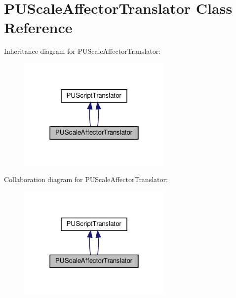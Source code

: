 \hypertarget{classPUScaleAffectorTranslator}{}\section{P\+U\+Scale\+Affector\+Translator Class Reference}
\label{classPUScaleAffectorTranslator}


Inheritance diagram for P\+U\+Scale\+Affector\+Translator\+:
\nopagebreak
\begin{figure}[H]
\begin{center}
\leavevmode
\includegraphics[width=214pt]{classPUScaleAffectorTranslator__inherit__graph}
\end{center}
\end{figure}


Collaboration diagram for P\+U\+Scale\+Affector\+Translator\+:
\nopagebreak
\begin{figure}[H]
\begin{center}
\leavevmode
\includegraphics[width=214pt]{classPUScaleAffectorTranslator__coll__graph}
\end{center}
\end{figure}
